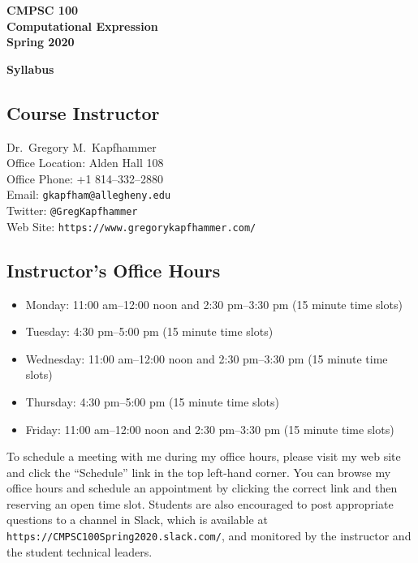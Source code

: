 \documentclass[11pt]{article}
\newcommand{\url}[1]{\lstinline{#1}}
\newcommand{\syllabustitle}[1]
{
  \begin{center}
    \begin{center}
      \bf
      CMPSC 100\\Computational Expression\\
      Spring 2020\\
      \medskip
    \end{center}
    \bf
    #1
  \end{center}
}
\begin{document}
\thispagestyle{empty}

\syllabustitle{Syllabus}

\vspace*{-.1in}
\subsection*{Course Instructor}
Dr.\ Gregory M.\ Kapfhammer\\
\noindent Office Location: Alden Hall 108 \\
\noindent Office Phone: +1 814--332--2880 \\
\noindent Email: \url{gkapfham@allegheny.edu} \\
\noindent Twitter: \url{@GregKapfhammer} \\
\noindent Web Site: \url{https://www.gregorykapfhammer.com/}

\subsection*{Instructor's Office Hours}

\vspace*{-.05in}

\begin{itemize}

  \itemsep.05em

  \item Monday: 11:00 am--12:00 noon and 2:30 pm--3:30 pm (15 minute time slots)

  \item Tuesday: 4:30 pm--5:00 pm (15 minute time slots)

  \item Wednesday: 11:00 am--12:00 noon and 2:30 pm--3:30 pm (15 minute time slots)

  \item Thursday: 4:30 pm--5:00 pm (15 minute time slots)

  \item Friday: 11:00 am--12:00 noon and 2:30 pm--3:30 pm (15 minute time slots)

\end{itemize}

\noindent To schedule a meeting with me during my office hours, please visit my
web site and click the ``Schedule'' link in the top left-hand corner. You can
browse my office hours and schedule an appointment by clicking the correct link
and then reserving an open time slot. Students are also encouraged to post
appropriate questions to a channel in Slack, which is available at
\url{https://CMPSC100Spring2020.slack.com/}, and monitored by the instructor
and the student technical leaders.
\end{document}
